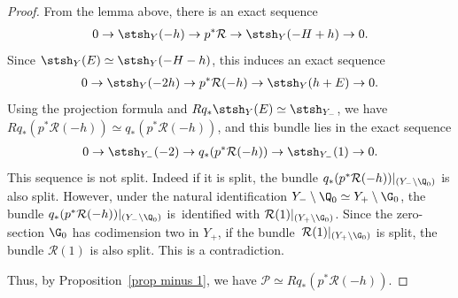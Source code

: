 \begin{proof}
From the lemma above, there is an exact sequence
\begin{gather*}
0 \to \stsh_Y(-h) \to p^* \mathcal{R} \to \stsh_Y(-H + h) \to 0.
\end{gather*}
Since $\stsh_Y(E) \simeq \stsh_Y(-H-h)$, this induces an exact sequence
\begin{gather*}
0 \to \stsh_Y(-2h) \to p^* \mathcal{R}(-h) \to \stsh_Y(h+E) \to 0.
\end{gather*}
Using the projection formula and $Rq_*\stsh_Y(E) \simeq \stsh_{Y_-}$,
we have $Rq_*(p^*\mathcal{R}(-h)) \simeq q_*(p^*\mathcal{R}(-h))$, and this bundle lies in the exact sequence
\begin{gather*}
0 \to \stsh_{Y_-}(-2) \to q_*(p^* \mathcal{R}(-h)) \to \stsh_{Y_-}(1) \to 0.
\end{gather*}
This sequence is not split.
Indeed if it is split, the bundle $q_*(p^* \mathcal{R}(-h))|_{(Y_- \setminus \Q_0)}$ is also split.
However, under the natural identification $Y_- \setminus \Q_0 \simeq Y_+ \setminus \G_0$,
the bundle $q_*(p^* \mathcal{R}(-h))|_{(Y_- \setminus \Q_0)}$ is~identified with $\mathcal{R}(1)|_{(Y_+ \setminus \G_0)}$.
Since the zero-section $\G_0$ has codimension two in $Y_+$, if the bundle~$\mathcal{R}(1)|_{(Y_+ \setminus \G_0)}$ is split,
the bundle $\mathcal{R}(1)$ is also split.
This is a contradiction.

Thus, by Proposition~\ref{prop minus 1}, we have $\mathcal{P} \simeq Rq_*(p^*\mathcal{R}(-h))$.
\end{proof}

